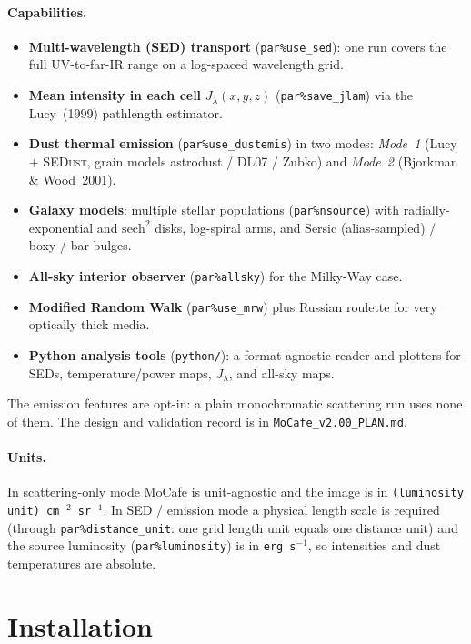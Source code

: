 \documentclass[english,a4paper]{kiseon_memo}
\newcommand{\pp}[1]{\texttt{par\%#1}}
\newcommand{\code}[1]{\texttt{#1}}
\newcommand{\file}[1]{\texttt{#1}}
\begin{document}
\paragraph{Capabilities.}
\begin{itemize}
\item \textbf{Multi-wavelength (SED) transport} (\pp{use\_sed}): one run covers
      the full UV-to-far-IR range on a log-spaced wavelength grid.
\item \textbf{Mean intensity in each cell} $J_\lambda(x,y,z)$ (\pp{save\_jlam})
      via the Lucy~(1999) pathlength estimator.
\item \textbf{Dust thermal emission} (\pp{use\_dustemis}) in two modes:
      \emph{Mode~1} (Lucy + \textsc{SEDust}, grain models astrodust / DL07 /
      Zubko) and \emph{Mode~2} (Bjorkman \& Wood~2001).
\item \textbf{Galaxy models}: multiple stellar populations (\pp{nsource}) with
      radially-exponential and $\mathrm{sech}^2$ disks, log-spiral arms, and
      Sersic (alias-sampled) / boxy / bar bulges.
\item \textbf{All-sky interior observer} (\pp{allsky}) for the Milky-Way case.
\item \textbf{Modified Random Walk} (\pp{use\_mrw}) plus Russian roulette for
      very optically thick media.
\item \textbf{Python analysis tools} (\file{python/}): a format-agnostic reader
      and plotters for SEDs, temperature/power maps, $J_\lambda$, and all-sky maps.
\end{itemize}
The emission features are opt-in: a plain monochromatic scattering run uses none
of them.  The design and validation record is in \file{MoCafe\_v2.00\_PLAN.md}.

\paragraph{Units.}  In scattering-only mode MoCafe is unit-agnostic and the
image is in \code{(luminosity unit)\,cm$^{-2}$\,sr$^{-1}$}.  In SED / emission
mode a physical length scale is required (through \pp{distance\_unit}: one grid
length unit equals one distance unit) and the source luminosity
(\pp{luminosity}) is in \code{erg\,s$^{-1}$}, so intensities and dust
temperatures are absolute.

\section{Installation}
\end{document}
